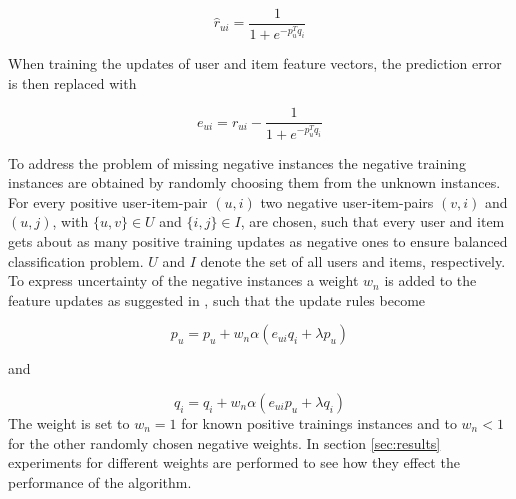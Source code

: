 \documentclass[10pt]{reportMaster}
\begin{document}
\begin{equation}
	\hat{r}_{ui} = \frac{1}{1 + e^{-p_u^Tq_i}}
\end{equation}

When training the updates of user and item feature vectors, the prediction error is then replaced with 

\begin{equation}
	e_{ui} = r_{ui} - \frac{1}{1 + e^{-p_u^Tq_i}}
\end{equation}


To address the problem of missing negative instances the negative training instances are obtained by randomly choosing them from the unknown instances.
For every positive user-item-pair $(u, i)$ two negative user-item-pairs $(v, i)$ and $(u,j)$, with $\{u, v\} \in U$ and $\{i, j\} \in I$, are chosen, such that every user and item gets about as many positive training updates as negative ones to ensure balanced classification problem.
$U$ and $I$ denote the set of all users and items, respectively.
To express uncertainty of the negative instances a weight $w_n$ is added to the feature updates as suggested in \cite{occf}, such that the update rules become 

\begin{equation}
	p_u = p_u + w_n \alpha (e_{ui} q_i + \lambda p_u)
\end{equation}

and 

\begin{equation}
	q_i = q_i + w_n \alpha (e_{ui} p_u + \lambda q_i)
\end{equation}
The weight is set to $w_n = 1$ for known positive trainings instances and to $w_n < 1$ for the other randomly chosen negative weights.
In section \ref{sec:results} experiments for different weights are performed to see how they effect the performance of the algorithm.
\end{document}
